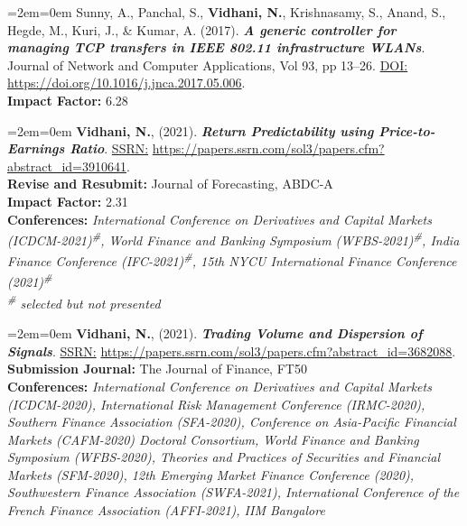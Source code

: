 \documentclass[11pt,a4paper,]{moderncv}
\begin{document}
\begingroup
\setlength{\parindent}{-0.5in}
\setlength{\leftskip}{0.5in}

%
  \par%
  \medskip
  \leftskip=2em\rightskip=0em%
  \noindent\ignorespaces
Sunny, A., Panchal, S., \textbf{Vidhani, N.}, Krishnasamy, S., Anand, S., Hegde, M., Kuri, J., \& Kumar, A. (2017). \textbf{\textit{A generic controller for managing TCP transfers in IEEE 802.11 infrastructure WLANs}}. Journal of Network and Computer Applications, Vol 93, pp 13--26. \underline{DOI:} \url{https://doi.org/10.1016/j.jnca.2017.05.006}.\\
\textbf{Impact Factor:} 6.28\\
%
  \par\medskip

%
  \par%
  \medskip
  \leftskip=2em\rightskip=0em%
  \noindent\ignorespaces
\textbf{Vidhani, N.}, (2021). \textbf{\textit{Return Predictability using
Price-to-Earnings Ratio}}. \underline{SSRN:} \url{https://papers.ssrn.com/sol3/papers.cfm?abstract_id=3910641}.\\
\textbf{Revise and Resubmit:} Journal of Forecasting, ABDC-A\\
\textbf{Impact Factor:} 2.31\\
\textbf{Conferences:} \textit{International Conference on Derivatives and Capital Markets (ICDCM-2021)\textsuperscript{\#}, World Finance and Banking Symposium (WFBS-2021)\textsuperscript{\#}, India Finance Conference (IFC-2021)\textsuperscript{\#}, 15th NYCU International Finance Conference (2021)\textsuperscript{\#}}\\
\textit{\textsuperscript{\#} selected but not presented}\\
%
  \par\medskip

%
  \par%
  \medskip
  \leftskip=2em\rightskip=0em%
  \noindent\ignorespaces
\textbf{Vidhani, N.}, (2021). \textbf{\textit{Trading Volume and Dispersion of Signals}}. \underline{SSRN:} \url{https://papers.ssrn.com/sol3/papers.cfm?abstract_id=3682088}.\\
\textbf{Submission Journal:} The Journal of Finance, FT50\\
\textbf{Conferences:} \textit{International Conference on Derivatives and Capital Markets (ICDCM-2020), International Risk Management Conference (IRMC-2020), Southern Finance Association (SFA-2020), Conference on Asia-Pacific Financial Markets (CAFM-2020) Doctoral Consortium, World Finance and Banking Symposium (WFBS-2020), Theories and Practices of Securities and Financial Markets (SFM-2020), 12th Emerging Market Finance Conference (2020), Southwestern Finance Association (SWFA-2021), International Conference of the French Finance Association (AFFI-2021), IIM Bangalore}\\
%
  \par\medskip
\end{document}
